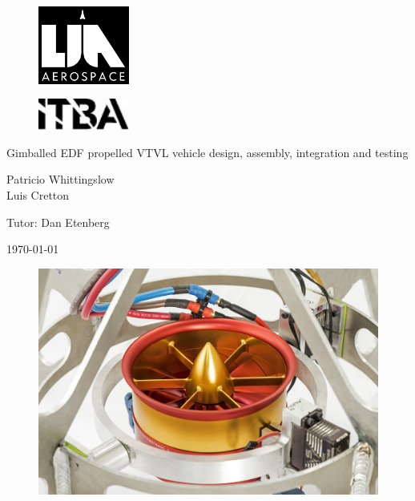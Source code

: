 \documentclass[11pt, titlepage]{article}
\author{Patricio Whittingslow \and Luis Cretton}
\begin{document}
\begin{titlepage}
	
	\centering
	\vspace{-1cm}
	\begin{figure}[htb]
		\centering
		\includegraphics[width=3cm]{fig/lia-aerospace-logo.png}
	\end{figure}
	\begin{figure}[htb]
		\centering
		\includegraphics[width=3cm]{fig/itba-logo.jpg}
	\end{figure}
	
	\vspace{1cm}
	{\Huge Gimballed EDF propelled VTVL vehicle design, assembly, integration and testing \par}
	\vspace{2cm}
	{ \large {
			Patricio Whittingslow \\ Luis Cretton 
		\par}}
	\vspace{1cm}
	{ \large {
			Tutor: Dan Etenberg
		\par}}
	\vspace{1cm}
	\today
	\vspace{1.5cm}
	\begin{figure}[htb]
		\centering
		\includegraphics[width=\linewidth]{fig/hq/gimbal_close.jpg}
	\end{figure}
\end{titlepage}
\end{document}
